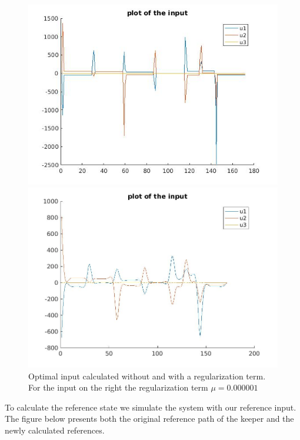 \documentclass[•]{article}
\begin{document}
\begin{figure}[H]
\begin{minipage}{.45\textwidth}
\includegraphics[width = \textwidth]{inputwithoutreg.jpg}
\end{minipage}
\begin{minipage}{.45\textwidth}
\includegraphics[width = \textwidth]{inputwithreg.jpg}
\end{minipage}
\caption{Optimal input calculated without and with a regularization term. For the input on the right the regularization term $\mu = 0.000001$}
\end{figure}

To calculate the reference state we simulate the system with our reference input. The figure below presents both the original reference path of the keeper and the newly calculated references.
\end{document}
